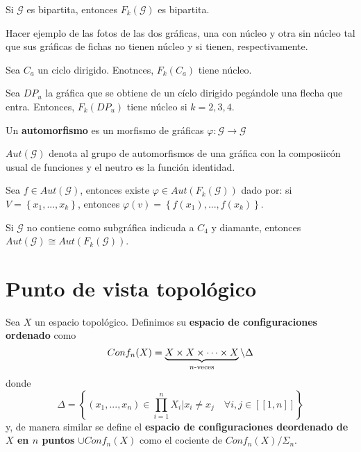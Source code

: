 \documentclass[12pt]{report}
\theoremstyle{largebreak}
\newcommand\cf[3]{\ensuremath{#1:#2\rightarrow#3}}
\newcommand\natint[1]{\ensuremath{\left[\!\left[ #1\right]\!\right]}}
\begin{document}
    \begin{theor}
        Si $\mathcal{G}$ es bipartita, entonces $F_k(\mathcal{G})$ es bipartita.
    \end{theor}

    \begin{exa}
        Hacer ejemplo de las fotos de las dos gráficas, una con núcleo y otra sin núcleo tal que sus gráficas de fichas no tienen núcleo y si tienen, respectivamente.
    \end{exa}

    \begin{theor}
        Sea $C_a$ un ciclo dirigido. Enotnces, $F_k(C_a)$ tiene núcleo.
    \end{theor}

    Sea $DP_u$ la gráfica que se obtiene de un cíclo dirigido pegándole una flecha que entra. Entonces, $F_k(DP_u)$ tiene núcleo si $k=2,3,4$.

    \begin{mydef}
        Un \textbf{automorfismo} es un morfismo de gráficas $\cf{\varphi}{\mathcal{G}}{\mathcal{G}}$
    \end{mydef}

    \begin{mydef}
        $Aut(\mathcal{G})$ denota al grupo de automorfismos de una gráfica con la composiicón usual de funciones y el neutro es la función identidad.
    \end{mydef}

    Sea $f\in Aut(\mathcal{G})$, entonces existe $\varphi\in Aut(F_k(\mathcal{G}))$ dado por: si $V=\left\{x_1,...,x_k\right\}$, entonces $\varphi(v)=\left\{f(x_1),...,f(x_k)\right\}$.

    \begin{theor}
        Si $\mathcal{G}$ no contiene como subgráfica indicuda a $C_4$ y diamante, entonces $Aut(\mathcal{G})\cong Aut(F_k(\mathcal{G}))$.
    \end{theor}

    \section{Punto de vista topológico}

    \begin{mydef}
        Sea $X$ un espacio topológico. Definimos su \textbf{espacio de configuraciones ordenado} como
        \begin{equation*}
            Conf_n(X)=\underbrace{X\times X\times\cdots\times X}_{ n\textup{-veces}}\backslash\Delta
        \end{equation*}
        donde
        \begin{equation*}
            \Delta=\left\{(x_1,...,x_n)\in \prod_{ i=1}^n X_i\Big|x_i\neq x_j\quad\forall i,j\in\natint{1,n} \right\}
        \end{equation*}
        y, de manera similar se define el \textbf{espacio de configuraciones deordenado de $X$ en $n$ puntos} $\cup Conf_n(X)$ como el cociente de $Conf_n(X)/\Sigma_n$.
    \end{mydef}
\end{document}
